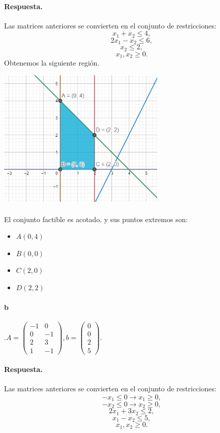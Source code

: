 \documentclass{article}
\begin{document}
	\paragraph{Respuesta.} Las matrices anteriores se convierten en el conjunto de restricciones:
	$$x_1 + x_2 \leq 4,$$
	$$2x_1 - x_2 \leq 6,$$
	$$x_2 \leq 2,$$
	$$x_1, x_2 \geq 0.$$
	Obtenemos la siguiente región.
	\begin{center}
		\includegraphics[width=0.6\textwidth]{3-a}
	\end{center}
	\paragraph{} El conjunto factible es acotado. y sus puntos extremos son:
	\begin{itemize}
		\item $A(0,4)$
		\item $B(0,0)$
		\item $C(2, 0)$
		\item $D(2,2)$
	\end{itemize}
	\paragraph{b}.$
	A = \begin{pmatrix}
	-1 & 0\\
	0 & -1\\
	2 & 3\\
	1 & -1
	\end{pmatrix},
	b = \begin{pmatrix}
	0\\
	0\\
	2\\
	5
	\end{pmatrix}
	$.
	\paragraph{Respuesta.} Las matrices anteriores se convierten en el conjunto de restricciones:
	$$-x_1 \leq 0 \xrightarrow{} x_1 \geq 0,$$
	$$-x_2 \leq 0 \xrightarrow{} x_2 \geq 0,$$
	$$2x_1 + 3x_2 \leq 2,$$
	$$x_1 - x_2 \leq 5,$$
	$$x_1, x_2 \geq 0.$$
\end{document}
